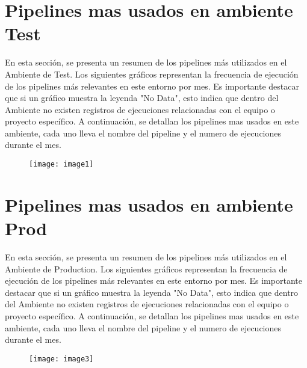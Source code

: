 \documentclass{article}
\begin{document}
\newpage

\section{Pipelines mas usados en ambiente Test}

\vspace{0.5cm}

En esta sección, se presenta un resumen de los pipelines más utilizados en el Ambiente de Test. Los siguientes gráficos representan la frecuencia de ejecución de los pipelines más relevantes en este entorno por mes.
Es importante destacar que si un gráfico muestra la leyenda "No Data", esto indica que dentro del Ambiente no existen registros de ejecuciones relacionadas con el equipo o proyecto específico.
A continuación, se detallan los pipelines mas usados en este ambiente, cada uno lleva el nombre del pipeline y el numero de ejecuciones durante el mes.

\vspace{0.8cm}

\begin{figure}[H]
    \centering
        \texttt{[image: image1]}\\
\end{figure}

\newpage

\section{Pipelines mas usados en ambiente Prod}

\vspace{0.5cm}

En esta sección, se presenta un resumen de los pipelines más utilizados en el Ambiente de Production. Los siguientes gráficos representan la frecuencia de ejecución de los pipelines más relevantes en este entorno por mes.
Es importante destacar que si un gráfico muestra la leyenda "No Data", esto indica que dentro del Ambiente no existen registros de ejecuciones relacionadas con el equipo o proyecto específico.
A continuación, se detallan los pipelines mas usados en este ambiente, cada uno lleva el nombre del pipeline y el numero de ejecuciones durante el mes.

\vspace{0.8cm}

\begin{figure}[H]
    \centering
        \texttt{[image: image3]}\\
\end{figure}

\vspace{0.5cm}
\end{document}
